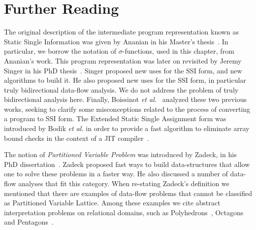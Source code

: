 \section{Further Reading}

The original description of the intermediate program representation known as Static Single Information was given by Ananian in his Master's thesis~\cite{Ananian99}.
In particular, we borrow the notation of $\sigma$-functions, used in this chapter, from Ananian's work.
This program representation was later on revisited by Jeremy Singer in his PhD thesis~\cite{Singer06}.
Singer proposed new uses for the SSI form, and new algorithms to build it. He also proposed new uses for the SSI form, in particular truly bidirectional data-flow analysis. We do not address the problem of truly bidirectional analysis here.
Finally, Boissinot {\em et al.}~\cite{Benoit09} analyzed these two previous works, seeking to clarify some misconceptions related to the process of converting a program to SSI form.
The Extended Static Single Assignment form was introduced by Bodik {\em et al.} in order to provide a fast algorithm to eliminate array bound checks in the context of a JIT compiler~\cite{Bodik00}.

The notion of {\em Partitioned Variable Problem} was introduced by Zadeck, in his PhD dissertation~\cite{Zadeck84}.
Zadeck proposed fast ways to build data-structures that allow one to solve these problems in a faster way.
He also discussed a number of data-flow analyses that fit this category.
When re-stating Zadeck's definition we mentioned that there are examples of data-flow problems that cannot be classified as Partitioned Variable Lattice.
Among these examples we cite abstract interpretation problems on relational domains, such as Polyhedrons~\cite{Cousot78}, Octagons~\cite{Mine06} and Pentagons~\cite{Logozzo08}.

